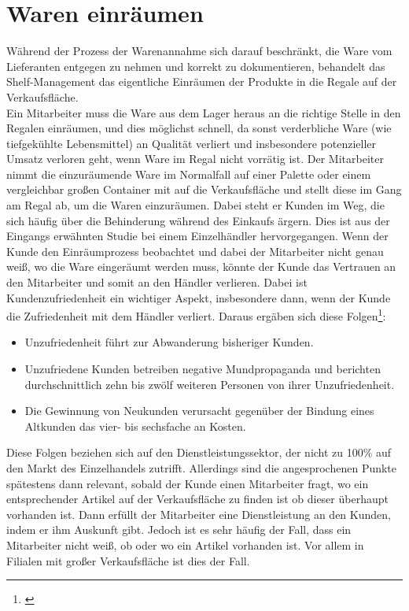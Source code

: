 \section{Waren einräumen}
\label{waren_einräumen}
Während der Prozess der Warenannahme sich darauf beschränkt, die Ware vom Lieferanten entgegen zu nehmen und korrekt zu dokumentieren, behandelt das Shelf-Management das eigentliche Einräumen der Produkte in die Regale auf der Verkaufsfläche.\\

Ein Mitarbeiter muss die Ware aus dem Lager heraus an die richtige Stelle in den Regalen einräumen, und dies möglichst schnell, da sonst verderbliche Ware (wie \zB tiefgekühlte Lebensmittel) an Qualität verliert und insbesondere potenzieller Umsatz verloren geht, wenn Ware im Regal nicht vorrätig ist. Der Mitarbeiter nimmt die einzuräumende Ware im Normalfall auf einer Palette oder einem vergleichbar großen Container mit auf die Verkaufsfläche und stellt diese im Gang am Regal ab, um die Waren einzuräumen. Dabei steht er Kunden im Weg, die sich häufig über die Behinderung während des Einkaufs ärgern. Dies ist aus der Eingangs erwähnten Studie bei einem Einzelhändler hervorgegangen. Wenn der Kunde den Einräumprozess beobachtet und dabei der Mitarbeiter nicht genau weiß, wo die Ware eingeräumt werden muss, könnte der Kunde das Vertrauen an den Mitarbeiter und somit an den Händler verlieren. Dabei ist Kundenzufriedenheit ein wichtiger Aspekt, insbesondere dann, wenn der Kunde die Zufriedenheit mit dem Händler verliert. Daraus ergäben sich diese Folgen\footnote{\citep{controlling}}:
\begin{itemize}
	\item Unzufriedenheit führt zur Abwanderung bisheriger Kunden.
	\item Unzufriedene Kunden betreiben negative Mundpropaganda und berichten durchschnittlich zehn bis zwölf weiteren Personen von ihrer Unzufriedenheit.
	\item Die Gewinnung von Neukunden verursacht gegenüber der Bindung eines Altkunden das vier- bis sechsfache an Kosten.
\end{itemize}
Diese Folgen beziehen sich auf den Dienstleistungssektor, der nicht zu 100\% auf den Markt des Einzelhandels zutrifft. Allerdings sind die angesprochenen Punkte spätestens dann relevant, sobald der Kunde einen Mitarbeiter fragt, wo ein entsprechender Artikel auf der Verkaufsfläche zu finden ist \bzw ob dieser überhaupt vorhanden ist. Dann erfüllt der Mitarbeiter eine Dienstleistung an den Kunden, indem er ihm Auskunft gibt. Jedoch ist es sehr häufig der Fall, dass ein Mitarbeiter nicht weiß, ob oder wo ein Artikel vorhanden ist. Vor allem in Filialen mit großer Verkaufsfläche ist dies der Fall.\\

